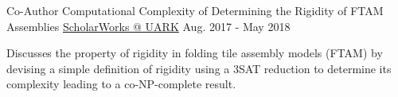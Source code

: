 

\begin{cventries}

  \cventry
    {Co-Author} %
    {Computational Complexity of Determining the Rigidity of FTAM Assemblies} %
    {\href{https://scholarworks.uark.edu/csceuht/48/}{ScholarWorks @ UARK}} %
    {Aug. 2017 - May 2018} %
    {
      \begin{cvitems} %
        \item {Discusses the property of rigidity in folding tile assembly models (FTAM) by devising a simple definition of rigidity using a 3SAT reduction to determine its complexity leading to a co-NP-complete result.}
      \end{cvitems}
    }

\end{cventries}
